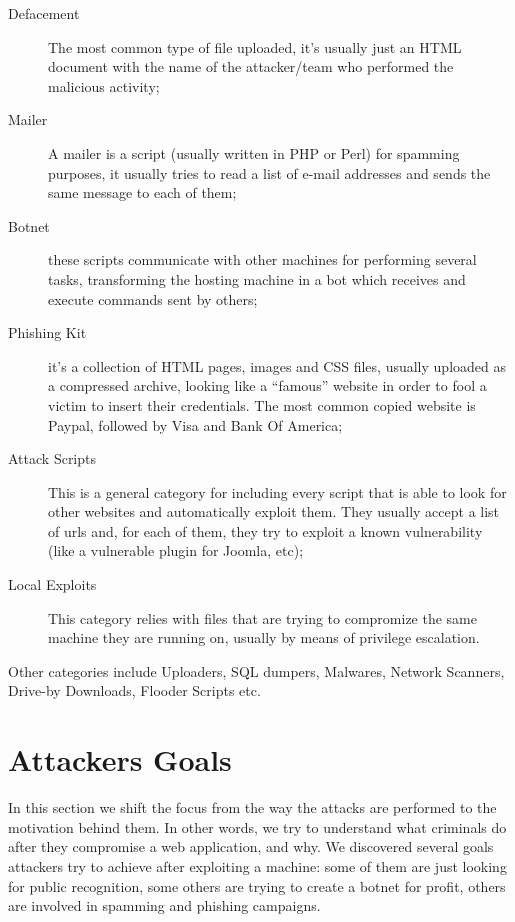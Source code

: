 \begin{description}
\item[Defacement] The most common type of file uploaded, it's usually just an HTML document with the name of the attacker/team who performed the malicious activity;
\item[Mailer] A mailer is a script (usually written in PHP or Perl) for spamming purposes, it usually tries to read a list of e-mail addresses and sends the same message to each of them;
\item[Botnet] these scripts communicate with other machines for performing several tasks, transforming the hosting machine in a bot which receives and execute commands sent by others;
\item[Phishing Kit] it's a collection of HTML pages, images and CSS files, usually uploaded as a compressed archive, looking like a ``famous'' website in order to fool a victim to insert their credentials. The most common copied website is Paypal, followed by Visa and Bank Of America;
\item[Attack Scripts] This is a general category for including every script that is able to look for other websites and automatically exploit them. They usually accept a list of urls and, for each of them, they try to exploit a known vulnerability (like a vulnerable plugin for Joomla, etc);
\item[Local Exploits] This category relies with files that are trying to compromize the same machine they are running on, usually by means of privilege escalation.
\end{description}

Other categories include Uploaders, SQL dumpers, Malwares, Network Scanners, Drive-by Downloads, Flooder Scripts etc.

\section{Attackers Goals}

In this section we shift the focus from the way the attacks are performed to the motivation behind them. In other words, we try to understand what criminals do after they compromise a web application, and why. We discovered several goals attackers try to achieve after exploiting a machine: some of them are just looking for public recognition, some others are trying to create a botnet for profit, others are involved in spamming and phishing campaigns.


